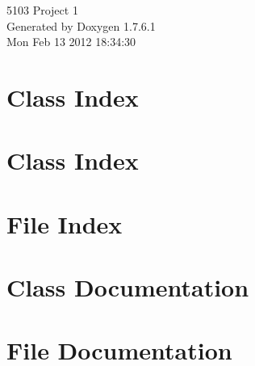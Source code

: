 \documentclass[a4paper]{book}
\begin{document}
\hypersetup{pageanchor=false,citecolor=blue}
\begin{titlepage}
\vspace*{7cm}
\begin{center}
{\Large 5103 \-Project 1 }\\
\vspace*{1cm}
{\large \-Generated by Doxygen 1.7.6.1}\\
\vspace*{0.5cm}
{\small Mon Feb 13 2012 18:34:30}\\
\end{center}
\end{titlepage}
\clearemptydoublepage
{}
\tableofcontents
\clearemptydoublepage
{}
\hypersetup{pageanchor=true,citecolor=blue}
\chapter{\-Class \-Index}

\chapter{\-Class \-Index}

\chapter{\-File \-Index}

\chapter{\-Class \-Documentation}













\chapter{\-File \-Documentation}






\printindex
\end{document}
